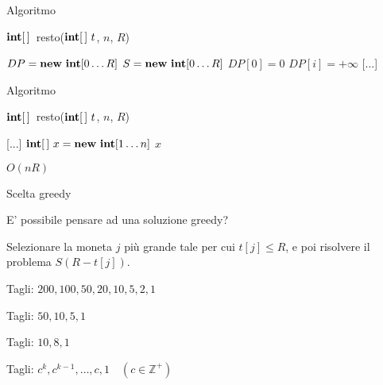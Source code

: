 \begin{frame}{Algoritmo}

\vspace{-12pt}
\begin{Procedure}
\caption[A]{$\INTARRAY$\ \textsf{resto}($\INTARRAY\ t$, \INTEGER $n$, \INTEGER $R$)}
$DP = \NEW\ \INTEGER[0 \ldots R]$\;
$S = \NEW\ \INTEGER[0 \ldots R]$\;
$DP[0] = 0$\;
 {
  $DP[i] = +\infty$\;
   {
  }
}
[...]
\end{Procedure}

\end{frame}


\begin{frame}{Algoritmo}

\vspace{-12pt}
\begin{Procedure}
\caption[A]{$\INTARRAY$\ \textsf{resto}($\INTARRAY\ t$, \INTEGER $n$, \INTEGER $R$)}
[...]\;
$\INTARRAY\ x = \NEW\ \INTEGER[1 \ldots n]$\;
\Return $x$\;
\end{Procedure}

\pause \alert{$O(nR)$}

\end{frame}




\begin{frame}{Scelta greedy}

\vspace{-6pt}
\begin{myboxtitle}[Domanda]
E' possibile pensare ad una soluzione greedy?
\end{myboxtitle}

\begin{myboxtitle}[Risposta]
Selezionare la moneta $j$ più grande tale per cui $t[j] \leq R$, e poi risolvere 
il problema $S(R-t[j])$.
\end{myboxtitle}

\pause
\begin{myboxtitle}[Esempi]
\BIL
\item Tagli: $200, 100, 50, 20, 10, 5, 2, 1$
\item Tagli: $50, 10, 5, 1$
\item Tagli: $10, 8, 1$
\item Tagli: $c^k, c^{k-1}, \ldots, c, 1 \quad (c \in \mathbb{Z^+})$
\EIL
\end{myboxtitle}


\end{frame}

